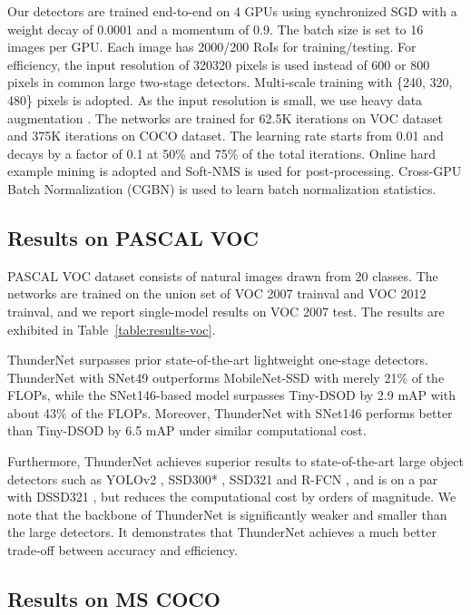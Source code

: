 Our detectors are trained end-to-end on 4 GPUs using synchronized SGD with a weight decay of 0.0001 and a momentum of 0.9.
The batch size is set to 16 images per GPU.
Each image has 2000/200 RoIs for training/testing.
For efficiency, the input resolution of 320320 pixels is used instead of 600 or 800 pixels in common large two-stage detectors.
Multi-scale training with \{240, 320, 480\} pixels is adopted.
As the input resolution is small, we use heavy data augmentation \cite{liu2016ssd}.
The networks are trained for 62.5K iterations on VOC dataset and 375K iterations on COCO dataset.
The learning rate starts from 0.01 and decays by a factor of 0.1 at 50\% and 75\% of the total iterations.
Online hard example mining \cite{shrivastava2016training} is adopted and Soft-NMS \cite{bodla2017soft} is used for post-processing.
Cross-GPU Batch Normalization (CGBN) \cite{peng2018megdet} is used to learn batch normalization statistics.

\subsection{Results on PASCAL VOC}

PASCAL VOC dataset consists of natural images drawn from 20 classes.
The networks are trained on the union set of VOC 2007 trainval and VOC 2012 trainval, and we report single-model results on VOC 2007 test.
The results are exhibited in Table~\ref{table:results-voc}.

ThunderNet surpasses prior state-of-the-art lightweight one-stage detectors.
ThunderNet with SNet49 outperforms MobileNet-SSD with merely 21\% of the FLOPs, while the SNet146-based model surpasses Tiny-DSOD by 2.9 mAP with about 43\% of the FLOPs.
Moreover, ThunderNet with SNet146 performs better than Tiny-DSOD by 6.5 mAP under similar computational cost.

Furthermore, ThunderNet achieves superior results to state-of-the-art large object detectors such as YOLOv2 \cite{redmon2017yolo9000}, SSD300* \cite{liu2016ssd}, SSD321 \cite{liu2016ssd} and R-FCN \cite{dai2016r}, and is on a par with DSSD321 \cite{fu2017dssd}, but reduces the computational cost by orders of magnitude.
We note that the backbone of ThunderNet is significantly weaker and smaller than the large detectors.
It demonstrates that ThunderNet achieves a much better trade-off between accuracy and efficiency.

\subsection{Results on MS COCO}

